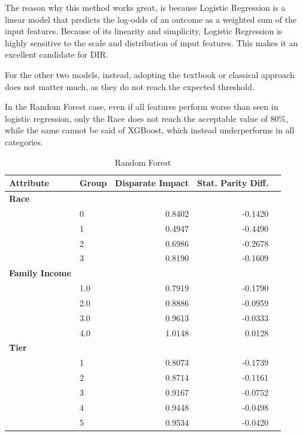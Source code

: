 \documentclass{article}
\begin{document}
The reason why this method works great, is because Logistic Regression is a linear model that predicts the log-odds of an outcome as a weighted sum of the input features. Because of its linearity and simplicity, Logistic Regression is highly sensitive to the scale and distribution of input features. This makes it an excellent candidate for DIR. 

For the other two models, instead, adopting the textbook or classical approach does not matter much, as they do not reach the expected threshold.

In the Random Forest case, even if all features perform worse than seen in logistic regression, only the Race does not reach the acceptable value of 80\%, while the same cannot be said of XGBoost, which instead underperforms in all categories. 

\begin{table}[ht]
\centering
\caption{Random Forest}
\label{tab:fairness_alternative_config}
\begin{tabular}{llrrr}
\toprule
Attribute & Group & Disparate Impact & Stat. Parity Diff. \\
\midrule
\textbf{Race} \\
& 0 & 0.8402 & -0.1420 \\
& 1 & 0.4947 & -0.4490 \\
& 2 & 0.6986 & -0.2678 \\
& 3 & 0.8190 & -0.1609 \\
\midrule
\textbf{Family Income} \\
& 1.0 & 0.7919 & -0.1790 \\
& 2.0 & 0.8886 & -0.0959 \\
& 3.0 & 0.9613 & -0.0333 \\
& 4.0 & 1.0148 & 0.0128 \\
\midrule
\textbf{Tier} \\
& 1 & 0.8073 & -0.1739 \\
& 2 & 0.8714 & -0.1161 \\
& 3 & 0.9167 & -0.0752 \\
& 4 & 0.9448 & -0.0498 \\
& 5 & 0.9534 & -0.0420 \\
\bottomrule
\end{tabular}
\end{table}
\end{document}
